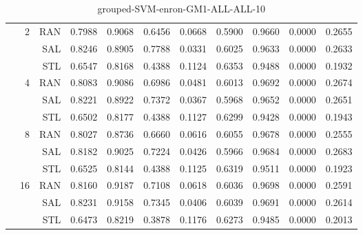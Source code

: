 \begin{center}
\begin{table}[htbp]
\begin{center}
\begin{tabular}{ | r | r | r | r | r | r | r | r | r | r | r |}
 & \multirow{3}{*}{2} & RAN & 0.7988 & 0.9068 & 0.6456 & 0.0668 & 0.5900 & 0.9660 & 0.0000 & 0.2655\\ \cline{3-11}
 &   & SAL & 0.8246 & 0.8905 & 0.7788 & 0.0331 & 0.6025 & 0.9633 & 0.0000 & 0.2633\\ \cline{3-11}
 &   & STL & 0.6547 & 0.8168 & 0.4388 & 0.1124 & 0.6353 & 0.9488 & 0.0000 & 0.1932\\ \cline{2-11}
 & \multirow{3}{*}{4} & RAN & 0.8083 & 0.9086 & 0.6986 & 0.0481 & 0.6013 & 0.9692 & 0.0000 & 0.2674\\ \cline{3-11}
 &   & SAL & 0.8221 & 0.8922 & 0.7372 & 0.0367 & 0.5968 & 0.9652 & 0.0000 & 0.2651\\ \cline{3-11}
 &   & STL & 0.6502 & 0.8177 & 0.4388 & 0.1127 & 0.6299 & 0.9428 & 0.0000 & 0.1943\\ \cline{2-11}
 & \multirow{3}{*}{8} & RAN & 0.8027 & 0.8736 & 0.6660 & 0.0616 & 0.6055 & 0.9678 & 0.0000 & 0.2555\\ \cline{3-11}
 &   & SAL & 0.8182 & 0.9025 & 0.7224 & 0.0426 & 0.5966 & 0.9684 & 0.0000 & 0.2683\\ \cline{3-11}
 &   & STL & 0.6525 & 0.8144 & 0.4388 & 0.1125 & 0.6319 & 0.9511 & 0.0000 & 0.1923\\ \cline{2-11}
 & \multirow{3}{*}{16} & RAN & 0.8160 & 0.9187 & 0.7108 & 0.0618 & 0.6036 & 0.9698 & 0.0000 & 0.2591\\ \cline{3-11}
 &   & SAL & 0.8231 & 0.9158 & 0.7345 & 0.0406 & 0.6039 & 0.9691 & 0.0000 & 0.2614\\ \cline{3-11}
 &   & STL & 0.6473 & 0.8219 & 0.3878 & 0.1176 & 0.6273 & 0.9485 & 0.0000 & 0.2013\\ \cline{2-11}
\hline
\end{tabular}
\caption{grouped-SVM-enron-GM1-ALL-ALL-10}
\end{center}
 \end{table}
\end{center}

